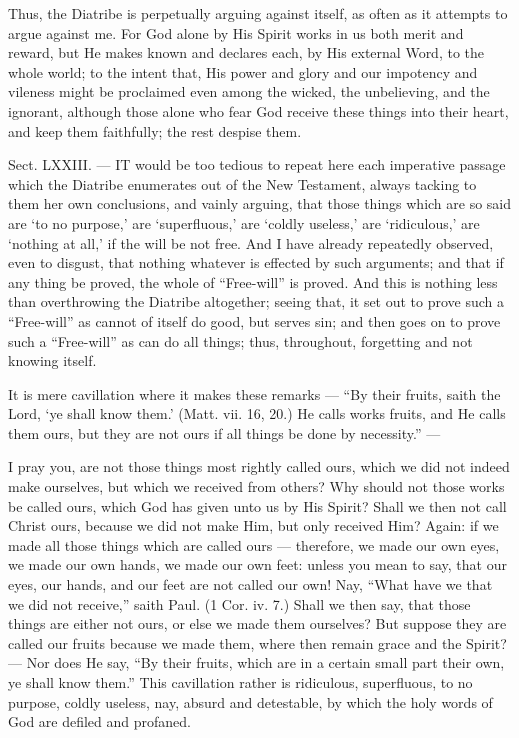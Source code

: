Thus, the Diatribe is perpetually arguing against itself, as often as it attempts to argue against me. For God alone by His Spirit works in us both merit and reward, but He makes known and declares each, by His external Word, to the whole world; to the intent that, His power and glory and our impotency and vileness might be proclaimed even among the wicked, the unbelieving, and the ignorant, although those alone who fear God receive these things into their heart, and keep them faithfully; the rest despise them.


Sect. LXXIII. — IT would be too tedious to repeat here each imperative passage which the Diatribe enumerates out of the New Testament, always tacking to them her own conclusions, and vainly arguing, that those things which are so said are ‘to no purpose,’ are ‘superfluous,’ are ‘coldly useless,’ are ‘ridiculous,’ are ‘nothing at all,’ if the will be not free. And I have already repeatedly observed, even to disgust, that nothing whatever is effected by such arguments; and that if any thing be proved, the whole of “Free-will” is proved. And this is nothing less than overthrowing the Diatribe altogether; seeing that, it set out to prove such a “Free-will” as cannot of itself do good, but serves sin; and then goes on to prove such a “Free-will” as can do all things; thus, throughout, forgetting and not knowing itself.

It is mere cavillation where it makes these remarks — “By their fruits, saith the Lord, ‘ye shall know them.’ (Matt. vii. 16, 20.) He calls works fruits, and He calls them ours, but they are not ours if all things be done by necessity.” —

I pray you, are not those things most rightly called ours, which we did not indeed make ourselves, but which we received from others? Why should not those works be called ours, which God has given unto us by His Spirit? Shall we then not call Christ ours, because we did not make Him, but only received Him? Again: if we made all those things which are called ours — therefore, we made our own eyes, we made our own hands, we made our own feet: unless you mean to say, that our eyes, our hands, and our feet are not called our own! Nay, “What have we that we did not receive,” saith Paul. (1 Cor. iv. 7.) Shall we then say, that those things are either not ours, or else we made them ourselves? But suppose they are called our fruits because we made them, where then remain grace and the Spirit? — Nor does He say, “By their fruits, which are in a certain small part their own, ye shall know them.” This cavillation rather is ridiculous, superfluous, to no purpose, coldly useless, nay, absurd and detestable, by which the holy words of God are defiled and profaned.

